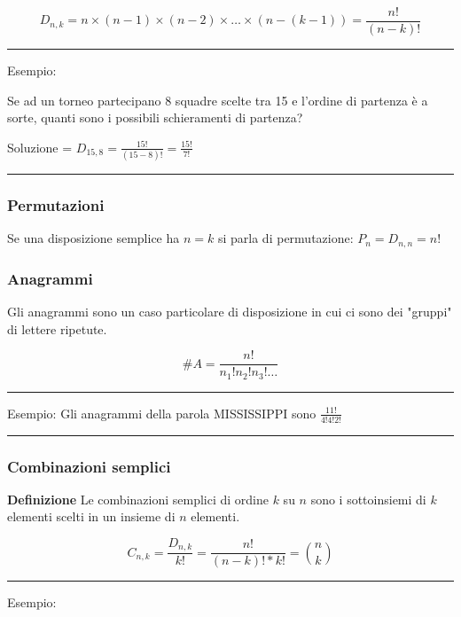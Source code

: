 \documentclass{article}
\begin{document}
$$D_{n,k}=n\times (n-1) \times (n-2) \times \ldots \times (n-(k-1)) = \frac{n!}{(n-k)!}$$

\vspace{2pt}

\noindent\rule{\textwidth}{0.5pt}

\noindent Esempio:\newline  

\noindent Se ad un torneo partecipano 8 squadre scelte tra 15 e l’ordine di partenza è a sorte,
quanti sono i possibili schieramenti di partenza?\newline

\noindent Soluzione = $D_{15,8} = \frac{15!}{(15-8)!}= \frac{15!}{7!}$

\noindent\rule{\textwidth}{0.5pt}

\subsubsection{Permutazioni}

Se una disposizione semplice ha $n=k$ si parla di permutazione: $P_n=D_{n,n}=n!$

\subsubsection{Anagrammi}

Gli anagrammi sono un caso particolare di disposizione in cui ci sono dei "gruppi" di lettere ripetute.

$$\#A = \frac{n!}{n_1!n_2!n_3!\ldots}$$

\noindent\rule{\textwidth}{0.5pt}

\noindent Esempio: Gli anagrammi della parola MISSISSIPPI sono $\frac{11!}{4!4!2!}$

\noindent\rule{\textwidth}{0.5pt}

\subsubsection{Combinazioni semplici}

\textbf{Definizione} Le combinazioni semplici di ordine $k$ su $n$ sono i sottoinsiemi di
$k$ elementi scelti in un insieme di $n$ elementi.

$$C_{n,k}=\frac{D_{n,k}}{k!}=\frac{n!}{(n-k)!*k!}=\binom{n}{k}$$

\noindent\rule{\textwidth}{0.5pt}

\noindent Esempio:\newline
\end{document}
